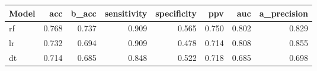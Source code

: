 \begin{tabular}{lrrrrrrr}
\toprule
Model &   acc &  b\_acc &  sensitivity &  specificity &   ppv &   auc &  a\_precision \\
\midrule
   rf & 0.768 &  0.737 &        0.909 &        0.565 & 0.750 & 0.802 &        0.829 \\
   lr & 0.732 &  0.694 &        0.909 &        0.478 & 0.714 & 0.808 &        0.855 \\
   dt & 0.714 &  0.685 &        0.848 &        0.522 & 0.718 & 0.685 &        0.698 \\
\bottomrule
\end{tabular}
